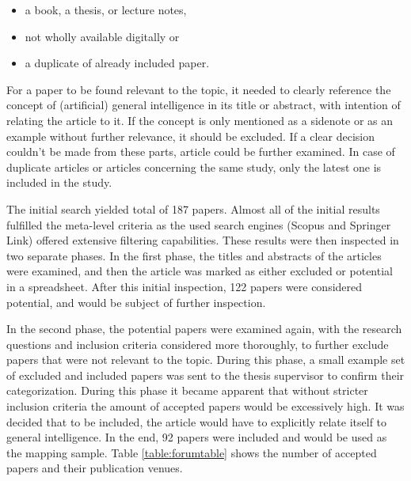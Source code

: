 \documentclass[utf8,english]{gradu3}
\begin{document}
\begin{itemize}
  \item a book, a thesis, or lecture notes,
  \item not wholly available digitally or
  \item a duplicate of already included paper.
\end{itemize}

For a paper to be found relevant to the topic, it needed to clearly reference
the concept of (artificial) general intelligence in its title or abstract, with
intention of relating the article to it. If the concept is only mentioned as a
sidenote or as an example without further relevance, it should be excluded. If a
clear decision couldn't be made from these parts, article could be further
examined. In case of duplicate articles or articles concerning the same study,
only the latest one is included in the study.

The initial search yielded total of 187 papers. Almost all of the initial
results fulfilled the meta-level criteria as the used search engines (Scopus and
Springer Link) offered extensive filtering capabilities. These results were then
inspected in two separate phases. In the first phase, the titles and abstracts
of the articles were examined, and then the article was marked as either
excluded or potential in a spreadsheet. After this initial inspection, 122
papers were considered potential, and would be subject of further inspection.

In the second phase, the potential papers were examined again, with the research
questions and inclusion criteria considered more thoroughly, to further exclude
papers that were not relevant to the topic. During this phase, a small example
set of excluded and included papers was sent to the thesis supervisor to confirm
their categorization. During this phase it became apparent that without stricter
inclusion criteria the amount of accepted papers would be excessively high. It
was decided that to be included, the article would have to explicitly relate
itself to general intelligence. In the end, 92 papers were included and would be
used as the mapping sample. Table \ref*{table:forumtable} shows the number of
accepted papers and their publication venues.
\end{document}
